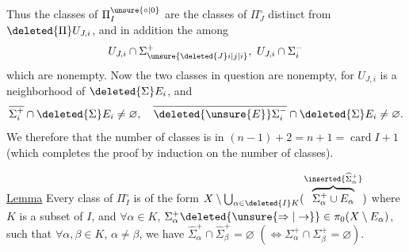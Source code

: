 Thus the classes of $\Pi_I^{\unsure{\circ|0}}$ are the classes of $\Pi_J^\circ$ distinct from $\deleted{\Pi}U_{J,i}$, and in addition the  among
\[
U_{J,i}\cap\Sigma_{\unsure{\deleted{J}i|j|i}}^+,\ U_{J,i}\cap\Sigma_i^-
\]
which are nonempty. Now the two classes in question are nonempty, for  $U_{J,i}$ is a neighborhood of $\deleted{\Sigma}E_i$, and
\[
\overline{\Sigma_i^+}\cap\deleted{\Sigma}E_i\ne\varnothing,\quad
\overline{\deleted{\unsure{E}}\Sigma_i^-}\cap\deleted{\Sigma}E_i\ne\varnothing.
\]
We therefore  that the number of classes is in  $(n-1)+2=n+1=\operatorname{card} I+1$ (which  completes the proof by induction on the number of classes).

\uline{Lemma} Every class of $\Pi_I^\circ$ is of the form $X\setminus\bigcup_{\alpha\in\deleted{I}K}(\overbrace{\Sigma_\alpha^+\cup E_\alpha}^{\inserted{\widehat{\Sigma}_\alpha^+}})$ where $K$ is a  subset of $I$, and
\reversemarginpar{}\normalmarginpar
$\forall\alpha\in K$,  $\Sigma_\alpha^+\deleted{\unsure{\Rightarrow|\to}}\in\pi_0(X\setminus E_\alpha)$, such that $\forall\alpha,\beta\in K$, $\alpha\ne\beta$, we have $\widehat{\Sigma}_\alpha^+\cap\widehat{\Sigma}_\beta^+=\varnothing$ $(\Longleftrightarrow\Sigma_\alpha^+\cap\Sigma_\beta^+=\varnothing)$.
